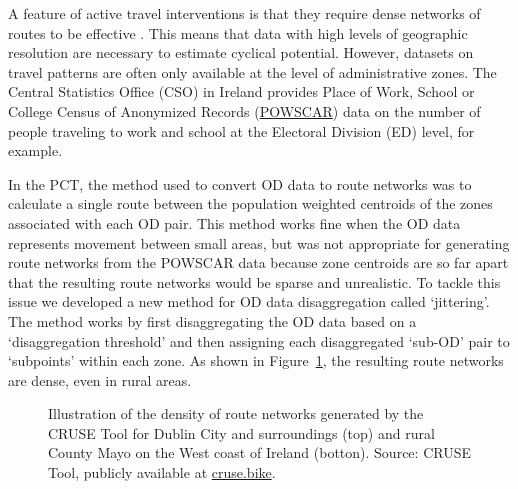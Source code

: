 \documentclass[
  super,
  preprint,
  3p]{elsarticle}
\begin{document}
A feature of active travel interventions is that they require dense
networks of routes to be effective \citep{parkin2018}. This means that
data with high levels of geographic resolution are necessary to estimate
cyclical potential. However, datasets on travel patterns are often only
available at the level of administrative zones. The Central Statistics
Office (CSO) in Ireland provides Place of Work, School or College Census
of Anonymized Records
(\href{https://www.cso.ie/en/census/census2016reports/powscar/}{POWSCAR})
data on the number of people traveling to work and school at the
Electoral Division (ED) level, for example.

In the PCT, the method used to convert OD data to route networks was to
calculate a single route between the population weighted centroids of
the zones associated with each OD pair. This method works fine when the
OD data represents movement between small areas, but was not appropriate
for generating route networks from the POWSCAR data because zone
centroids are so far apart that the resulting route networks would be
sparse and unrealistic. To tackle this issue we developed a new method
for OD data disaggregation called `jittering'. The method works by first
disaggregating the OD data based on a `disaggregation threshold' and
then assigning each disaggregated `sub-OD' pair to `subpoints' within
each zone. As shown in Figure~\ref{fig-dublin}, the resulting route
networks are dense, even in rural areas.

\begin{figure}


\caption{\label{fig-dublin}Illustration of the density of route networks
generated by the CRUSE Tool for Dublin City and surroundings (top) and
rural County Mayo on the West coast of Ireland (botton). Source: CRUSE
Tool, publicly available at \href{https://cruse.bike/}{cruse.bike}.}

\end{figure}%
\end{document}
